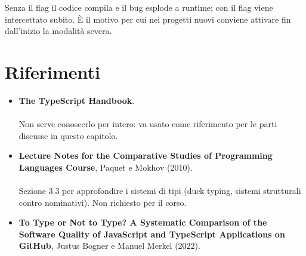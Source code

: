 Senza il flag il codice compila e il bug esplode a runtime; con il flag viene
intercettato subito. È il motivo per cui nei progetti nuovi conviene attivare
fin dall'inizio la modalità severa.

\section{Riferimenti}

\begin{itemize}
  \item \textbf{The TypeScript Handbook}. \\
         \\
        Non serve conoscerlo per intero: va usato come riferimento per le parti
        discusse in questo capitolo.
  \item \textbf{Lecture Notes for the Comparative Studies of Programming
        Languages Course}, Paquet e Mokhov (2010). \\
         \\
        Sezione 3.3 per approfondire i sistemi di tipi (duck typing, sistemi
        strutturali contro nominativi). Non richiesto per il corso.
  \item \textbf{To Type or Not to Type? A Systematic Comparison of the Software
        Quality of JavaScript and TypeScript Applications on GitHub}, Justus
        Bogner e Manuel Merkel (2022). \\
\end{itemize}
